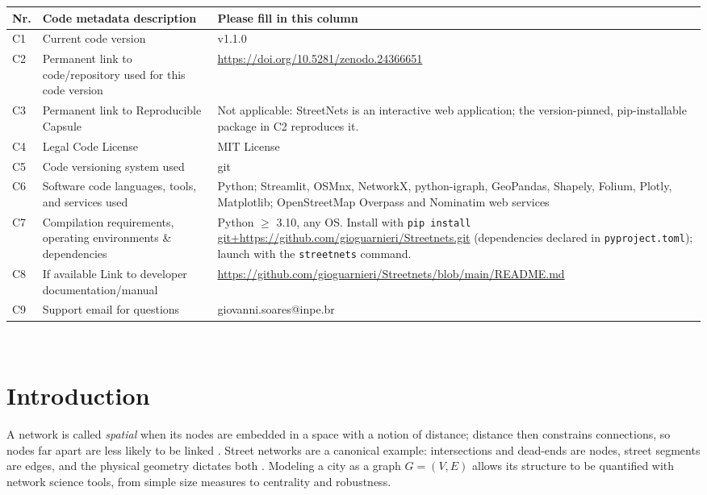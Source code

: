 \documentclass[11pt, letterpaper]{article}
\begin{document}
\noindent
\begin{tabular}{|l|p{6.5cm}|p{9.5cm}|}
\hline
\textbf{Nr.} & \textbf{Code metadata description} & \textbf{Please fill in this column} \\
\hline
C1 & Current code version & v1.1.0 \\
\hline
C2 & Permanent link to code/repository used for this code version & \url{https://doi.org/10.5281/zenodo.24366651} \\
\hline
C3  & Permanent link to Reproducible Capsule & Not applicable: StreetNets is an interactive web application; the version-pinned, pip-installable package in C2 reproduces it. \\
\hline
C4 & Legal Code License   & MIT License \\
\hline
C5 & Code versioning system used & git \\
\hline
C6 & Software code languages, tools, and services used & Python; Streamlit, OSMnx, NetworkX, python-igraph, GeoPandas, Shapely, Folium, Plotly, Matplotlib; OpenStreetMap Overpass and Nominatim web services \\
\hline
C7 & Compilation requirements, operating environments \& dependencies & Python $\geq$ 3.10, any OS. Install with \texttt{pip install} \url{git+https://github.com/gioguarnieri/Streetnets.git} (dependencies declared in \texttt{pyproject.toml}); launch with the \texttt{streetnets} command. \\
\hline
C8 & If available Link to developer documentation/manual & \footnotesize \url{https://github.com/gioguarnieri/Streetnets/blob/main/README.md} \\
\hline
C9 & Support email for questions & giovanni.soares@inpe.br \\
\hline
\end{tabular}\\

\section{Introduction}

A network is called \emph{spatial} when its nodes are embedded in a space with a notion of distance; distance then constrains connections, so nodes far apart are less likely to be linked \cite{barthelemy2011spatial, barthelemy2022spatial}. Street networks are a canonical example: intersections and dead-ends are nodes, street segments are edges, and the physical geometry dictates both \cite{boeing2017osmnx}. Modeling a city as a graph $G=(V,E)$ allows its structure to be quantified with network science tools, from simple size measures to centrality and robustness.
\end{document}

